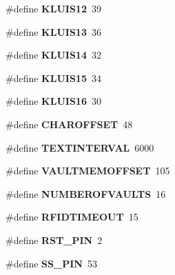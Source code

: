 \begin{DoxyCompactItemize}
\item 
\mbox{\label{_kluis___v2_8ino_a1649ba2a62c7af010b32077ad6867f6b}} 
\#define {\bfseries K\+L\+U\+I\+S12}~39
\item 
\mbox{\label{_kluis___v2_8ino_a98600c8af55b1fe478edbbefe2b88587}} 
\#define {\bfseries K\+L\+U\+I\+S13}~36
\item 
\mbox{\label{_kluis___v2_8ino_af4a916457a7db85399080b9737f9ccb2}} 
\#define {\bfseries K\+L\+U\+I\+S14}~32
\item 
\mbox{\label{_kluis___v2_8ino_a01170a7b5070bd26f8e7d55328467d7b}} 
\#define {\bfseries K\+L\+U\+I\+S15}~34
\item 
\mbox{\label{_kluis___v2_8ino_ad4fbc6a1e7aa1cea170fd6238be7c756}} 
\#define {\bfseries K\+L\+U\+I\+S16}~30
\item 
\mbox{\label{_kluis___v2_8ino_aa1bf756391a9960a2445236428e08068}} 
\#define {\bfseries C\+H\+A\+R\+O\+F\+F\+S\+ET}~48
\item 
\mbox{\label{_kluis___v2_8ino_a93d40d1de1ee786b74ada50aec0a7e9c}} 
\#define {\bfseries T\+E\+X\+T\+I\+N\+T\+E\+R\+V\+AL}~6000
\item 
\mbox{\label{_kluis___v2_8ino_a3f660dff51384cecab7ee796d548d5fe}} 
\#define {\bfseries V\+A\+U\+L\+T\+M\+E\+M\+O\+F\+F\+S\+ET}~105
\item 
\mbox{\label{_kluis___v2_8ino_aa3232d8d93a71284f97d96d70a4f5938}} 
\#define {\bfseries N\+U\+M\+B\+E\+R\+O\+F\+V\+A\+U\+L\+TS}~16
\item 
\mbox{\label{_kluis___v2_8ino_ad43e36c5e1c0d5a2852f6abd0d59752c}} 
\#define {\bfseries R\+F\+I\+D\+T\+I\+M\+E\+O\+UT}~15
\item 
\mbox{\label{_kluis___v2_8ino_a36932b0e869e0114f32e255f61306d6b}} 
\#define {\bfseries R\+S\+T\+\_\+\+P\+IN}~2
\item 
\mbox{\label{_kluis___v2_8ino_a86fac98c9b4c98a3e50fc45440878391}} 
\#define {\bfseries S\+S\+\_\+\+P\+IN}~53
\end{DoxyCompactItemize}
